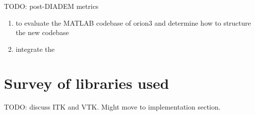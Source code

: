TODO: post-DIADEM metrics~\autocite{Mayerich2011,Mayerich2012,btmorph-Torben-Nielsen2014,Costa2014,Gillette2015}

\begin{enumerate}[label=(\roman*)]
\item to evaluate the MATLAB codebase of \gls{orion3} and determine how to structure the new codebase
\item integrate the
\end{enumerate}

%

\section{Survey of libraries used}

TODO: discuss ITK and VTK. Might move to implementation section.


